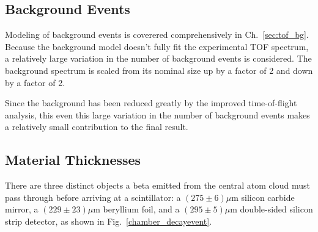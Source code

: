 \subsection{Background Events}
\label{section:background_events_systematics}
Modeling of background events is coverered comprehensively in Ch.~\ref{sec:tof_bg}.  Because the background model doesn't fully fit the experimental TOF spectrum, a relatively large variation in the number of background events is considered.  The background spectrum is scaled from its nominal size up by a factor of 2 and down by a factor of 2.  

Since the background has been reduced greatly by the improved time-of-flight
analysis, this even this large variation in the number of background events makes a relatively small contribution to the final result.



\subsection{Material Thicknesses}
There are three distinct objects a beta emitted from the central atom cloud must pass through before arriving at a scintillator:  a $(275 \pm 6) \mu$m silicon carbide mirror, a $(229 \pm 23) \mu$m beryllium foil, and a $(295 \pm 5) \mu$m double-sided silicon strip detector, as shown in Fig.~\ref{chamber_decayevent}.~

